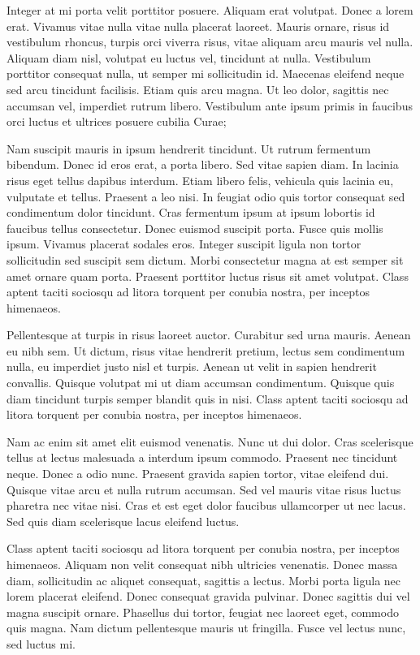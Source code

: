Integer at mi porta velit porttitor posuere. Aliquam erat volutpat.
Donec a lorem erat. Vivamus vitae nulla vitae nulla placerat laoreet.
Mauris ornare, risus id vestibulum rhoncus, turpis orci viverra risus,
vitae aliquam arcu mauris vel nulla. Aliquam diam nisl, volutpat eu
luctus vel, tincidunt at nulla. Vestibulum porttitor consequat nulla,
ut semper mi sollicitudin id. Maecenas eleifend neque sed arcu tincidunt
facilisis. Etiam quis arcu magna. Ut leo dolor, sagittis nec accumsan
vel, imperdiet rutrum libero. Vestibulum ante ipsum primis in faucibus
orci luctus et ultrices posuere cubilia Curae;

Nam suscipit mauris in ipsum hendrerit tincidunt. Ut rutrum fermentum
bibendum. Donec id eros erat, a porta libero. Sed vitae sapien diam.
In lacinia risus eget tellus dapibus interdum. Etiam libero felis,
vehicula quis lacinia eu, vulputate et tellus. Praesent a leo nisi.
In feugiat odio quis tortor consequat sed condimentum dolor tincidunt.
Cras fermentum ipsum at ipsum lobortis id faucibus tellus consectetur.
Donec euismod suscipit porta. Fusce quis mollis ipsum. Vivamus placerat
sodales eros. Integer suscipit ligula non tortor sollicitudin sed
suscipit sem dictum. Morbi consectetur magna at est semper sit amet
ornare quam porta. Praesent porttitor luctus risus sit amet volutpat.
Class aptent taciti sociosqu ad litora torquent per conubia nostra,
per inceptos himenaeos.

Pellentesque at turpis in risus laoreet auctor. Curabitur sed urna
mauris. Aenean eu nibh sem. Ut dictum, risus vitae hendrerit pretium,
lectus sem condimentum nulla, eu imperdiet justo nisl et turpis. Aenean
ut velit in sapien hendrerit convallis. Quisque volutpat mi ut diam
accumsan condimentum. Quisque quis diam tincidunt turpis semper blandit
quis in nisi. Class aptent taciti sociosqu ad litora torquent per
conubia nostra, per inceptos himenaeos.

Nam ac enim sit amet elit euismod venenatis. Nunc ut dui dolor. Cras
scelerisque tellus at lectus malesuada a interdum ipsum commodo. Praesent
nec tincidunt neque. Donec a odio nunc. Praesent gravida sapien tortor,
vitae eleifend dui. Quisque vitae arcu et nulla rutrum accumsan. Sed
vel mauris vitae risus luctus pharetra nec vitae nisi. Cras et est
eget dolor faucibus ullamcorper ut nec lacus. Sed quis diam scelerisque
lacus eleifend luctus.

Class aptent taciti sociosqu ad litora torquent per conubia nostra,
per inceptos himenaeos. Aliquam non velit consequat nibh ultricies
venenatis. Donec massa diam, sollicitudin ac aliquet consequat, sagittis
a lectus. Morbi porta ligula nec lorem placerat eleifend. Donec consequat
gravida pulvinar. Donec sagittis dui vel magna suscipit ornare. Phasellus
dui tortor, feugiat nec laoreet eget, commodo quis magna. Nam dictum
pellentesque mauris ut fringilla. Fusce vel lectus nunc, sed luctus
mi.

